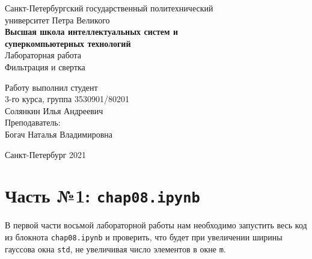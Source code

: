 \documentclass[a4paper]{article}
\begin{document}
    \begin{center}
        \begin{center}
        \hfill \break
        \normalsize{Санкт-Петербургский государственный политехнический}\\
        \normalsize{университет Петра Великого}\\
        \hfill \break
        \normalsize{\textbf{Высшая школа интеллектуальных систем и}}\\ 
        \normalsize{\textbf{суперкомпьютерных технологий}}\\ 
        \hfill \break
        \hfill \break
        \hfill \break
        \normalsize{Лабораторная работа}\\
        \hfill \break
        \hfill \break
        \normalsize{\LARGE Фильтрация и свертка}\\
        \end{center}
        \hfill \break
        \hfill \break
        \hfill \break
        \hfill \break
        \hfill \break
        \hfill \break
        \hfill \break
        \hfill \break
        \hfill \break
        \hfill \break
        \begin{flushright}
            \normalsize{Работу выполнил студент}\\
            \normalsize{3-го курса, группа 3530901/80201}\\
            \normalsize{Солянкин Илья Андреевич}\\
            \hfill \break
            \normalsize{Преподаватель:}\\
            \normalsize{Богач Наталья Владимировна}\\
        \end{flushright}
        \hfill \break
        \hfill \break
        \hfill \break
        \hfill \break
        \begin{center} Санкт-Петербург 2021 \end{center}
        \thispagestyle{empty}
    \end{center}
    
    \newpage
        \tableofcontents
    
    \newpage
         \listoffigures
    
    \newpage
         \lstlistoflistings   
     
    \newpage
        \section{Часть №1: \texttt{chap08.ipynb}}
            В первой части восьмой лабораторной работы нам необходимо запустить весь код из блокнота \texttt{chap08.ipynb} и проверить, что будет при увеличении ширины гауссова окна \texttt{std}, не увеличивая число элементов в окне \texttt{m}.
            
\end{document}
